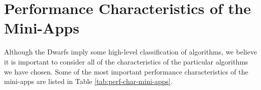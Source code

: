 \documentclass[runningheads,a4paper]{llncs}
\begin{document}
%
%
%
%


\section{Performance Characteristics of the Mini-Apps}

Although the Dwarfs imply some high-level classification of algorithms, we believe it is important to consider all of the characteristics of the particular algorithms we have chosen. Some of the most important performance characteristics of the mini-apps are listed in Table \ref{tab:perf-char-mini-apps}.
\end{document}
